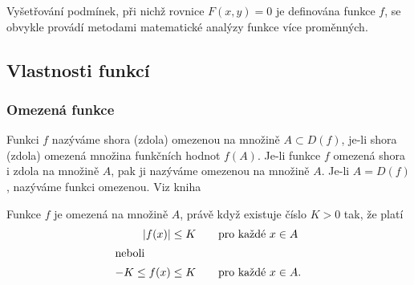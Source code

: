         
      
      Vyšetřování podmínek, při nichž rovnice $F(x,y)=0$ je definována funkce $f$, se obvykle 
      provádí metodami matematické analýzy funkce více proměnných. 
          
    \subsection{Vlastnosti funkcí}\label{MA1:subsec_vlastnosti_funkce}
      \subsubsection{Omezená funkce}
        \begin{definition}\label{MA1:def_lim01}
          Funkci $f$ nazýváme shora (zdola) omezenou na množině $A\subset D(f)$, je-li shora 
          (zdola) omezená množina funkčních hodnot $f(A)$. Je-li funkce $f$ omezená shora i zdola 
          na množině $A$, pak ji nazýváme omezenou na množině $A$. Je-li $A=D(f)$, nazýváme funkci 
          omezenou. Viz kniha \cite[s.~87]{Brabec1989}       
        \end{definition}
        Funkce \(f\) je omezená na množině \(A\), právě když existuje číslo \(K>0\) tak, že platí
        \begin{align*}
         |f(x)|      &\leq K \qquad \text{pro každé } x\in A   \\ 
         \shortintertext{neboli}
         -K\leq f(x) &\leq K \qquad \text{pro každé } x\in A. 
        \end{align*}

          

